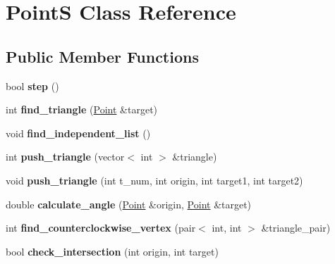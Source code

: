 \hypertarget{class_point_s}{}\section{PointS Class Reference}
\label{class_point_s}
\subsection*{Public Member Functions}
\begin{DoxyCompactItemize}
\item 
\mbox{\label{class_point_s_aa326f7feeab9d67f0f982ae81e7f7107}} 
bool {\bfseries step} ()
\item 
\mbox{\label{class_point_s_a55e02b4dfa21b67cea646fba63e38acd}} 
int {\bfseries find\+\_\+triangle} (\mbox{\hyperlink{class_point}{Point}} \&target)
\item 
\mbox{\label{class_point_s_a6c723b455643c3cbcb9083312ff43a07}} 
void {\bfseries find\+\_\+independent\+\_\+list} ()
\item 
\mbox{\label{class_point_s_aba3873fb56541f26b96b5fba72043248}} 
int {\bfseries push\+\_\+triangle} (vector$<$ int $>$ \&triangle)
\item 
\mbox{\label{class_point_s_aaf327e1dd4fe85af2becc0e65a5a4b88}} 
void {\bfseries push\+\_\+triangle} (int t\+\_\+num, int origin, int target1, int target2)
\item 
\mbox{\label{class_point_s_a3fbf7bedbb5bb170580ad221bd79b1c7}} 
double {\bfseries calculate\+\_\+angle} (\mbox{\hyperlink{class_point}{Point}} \&origin, \mbox{\hyperlink{class_point}{Point}} \&target)
\item 
\mbox{\label{class_point_s_a5118b46e151d7dd043d60ff1a703fb0d}} 
int {\bfseries find\+\_\+counterclockwise\+\_\+vertex} (pair$<$ int, int $>$ \&triangle\+\_\+pair)
\item 
\mbox{\label{class_point_s_a3eed5c258d7c0688a693b520eb1382b0}} 
bool {\bfseries check\+\_\+intersection} (int origin, int target)
\item 
\mbox{\label{class_point_s_a8b9e5651c87a328c990d775234a111cf}} 

\end{DoxyCompactItemize}
